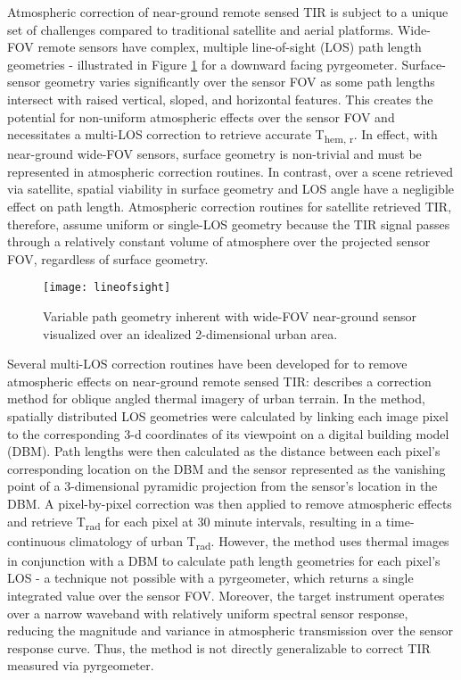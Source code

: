 \begin{bibunit}

Atmospheric correction of near-ground remote sensed TIR is subject to a unique set of challenges compared to traditional satellite and aerial platforms. Wide-FOV remote sensors have complex, multiple line-of-sight (LOS) path length geometries - illustrated in Figure \ref{lineofsight} for a downward facing pyrgeometer. Surface-sensor geometry varies significantly over the sensor FOV as some path lengths intersect with raised vertical, sloped, and horizontal features. This creates the potential for non-uniform atmospheric effects over the sensor FOV and necessitates a multi-LOS correction to retrieve accurate T\textsubscript{hem, r}. In effect, with near-ground wide-FOV sensors, surface geometry is non-trivial and must be represented in atmospheric correction routines. In contrast, over a scene retrieved via satellite, spatial viability in surface geometry and LOS angle have a negligible effect on path length. Atmospheric correction routines for satellite retrieved TIR, therefore, assume uniform or single-LOS geometry because the TIR signal passes through a relatively constant volume of atmosphere over the projected sensor FOV, regardless of surface geometry.

\begin{figure}[H]
	\texttt{[image: lineofsight]}
	\caption{Variable path geometry inherent with wide-FOV near-ground sensor visualized over an idealized 2-dimensional urban area.}
	\label{lineofsight}
\end{figure}

Several multi-LOS correction routines have been developed for to remove atmospheric effects on near-ground remote sensed TIR: \citet{Meier2011} describes a correction method for oblique angled thermal imagery of urban terrain. In the method, spatially distributed LOS geometries were calculated by linking each image pixel to the corresponding 3-d coordinates of its viewpoint on a digital building model (DBM). Path lengths were then calculated as the distance between each pixel's corresponding location on the DBM and the sensor represented as the vanishing point of a 3-dimensional pyramidic projection from the sensor's location in the DBM. A pixel-by-pixel correction was then applied to remove atmospheric effects and retrieve T\textsubscript{rad} for each pixel at 30 minute intervals, resulting in a time-continuous climatology of urban T\textsubscript{rad}. However, the method uses thermal images in conjunction with a DBM to calculate path length geometries for each pixel's LOS - a technique not possible with a pyrgeometer, which returns a single integrated value over the sensor FOV. Moreover, the target instrument operates over a narrow waveband with relatively uniform spectral sensor response, reducing the magnitude and variance in atmospheric transmission over the sensor response curve. Thus, the method is not directly generalizable to correct TIR measured via pyrgeometer.


\end{bibunit}
